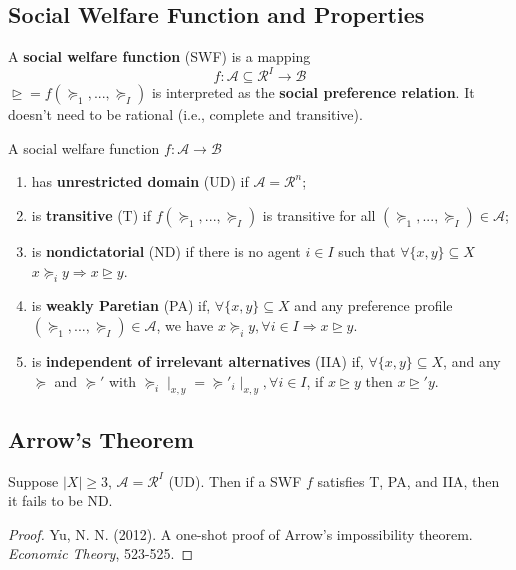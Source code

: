 \documentclass[11pt]{elegantbook}
\begin{document}
\subsection{Social Welfare Function and Properties}
\begin{definition}
    \normalfont
    A \textbf{social welfare function} (SWF) is a mapping $$f: \mathcal{A}\subseteq \mathcal{R}^I\rightarrow \mathcal{B}$$
    $\trianglerighteq=f(\succeq_1,...,\succeq_I)$ is interpreted as the \textbf{social preference relation}. It doesn't need to be rational (i.e., complete and transitive).
\end{definition}

\begin{definition}
    \normalfont
    A social welfare function $f: \mathcal{A}\rightarrow \mathcal{B}$
    \begin{enumerate}[$\circ$]
        \item has \textbf{unrestricted domain} (UD) if $\mathcal{A}=\mathcal{R}^n$;
        \item is \textbf{transitive} (T) if $f(\succeq_1,...,\succeq_I)$ is transitive for all $(\succeq_1,...,\succeq_I)\in \mathcal{A}$;
        \item is \textbf{nondictatorial} (ND) if there is no agent $i\in I$ such that $\forall \{x,y\}\subseteq X$ $x\succeq_i y \Rightarrow x\trianglerighteq y$.
        \item is \textbf{weakly Paretian} (PA) if, $\forall \{x,y\}\subseteq X$ and any preference profile $(\succeq_1,...,\succeq_I)\in \mathcal{A}$, we have $x\succeq_i y,\forall i\in I \Rightarrow x\trianglerighteq y$.
        \item is \textbf{independent of irrelevant alternatives} (IIA) if, $\forall \{x,y\}\subseteq X$, and any $\succeq$ and $\succeq'$ with $\succeq_i\mid_{x,y}=\succeq'_i\mid_{x,y}, \forall i\in I$, if $x\trianglerighteq y$ then $x\trianglerighteq' y$.
    \end{enumerate}
\end{definition}


\subsection{Arrow's Theorem}
\begin{theorem}
    Suppose $|X|\geq 3$, $\mathcal{A}=\mathcal{R}^I$ (UD). Then if a SWF $f$ satisfies T, PA, and IIA, then it fails to be ND.
\end{theorem}
\begin{proof}
    \normalfont
    Yu, N. N. (2012). A one-shot proof of Arrow's impossibility theorem. \textit{Economic Theory}, 523-525.
\end{proof}
\end{document}
